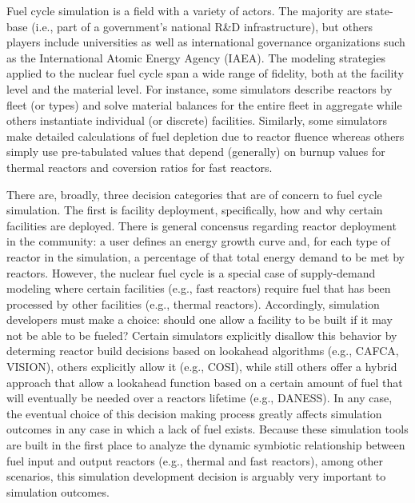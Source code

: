 Fuel cycle simulation is a field with a variety of actors. The majority are
state-base (i.e., part of a government's national R\&D infrastructure), but
others players include universities as well as international governance
organizations such as the International Atomic Energy Agency (IAEA). The
modeling strategies applied to the nuclear fuel cycle span a wide range of
fidelity, both at the facility level and the material level. For instance, some
simulators describe reactors by fleet (or types) and solve material balances for
the entire fleet in aggregate while others instantiate individual (or discrete)
facilities. Similarly, some simulators make detailed calculations of fuel
depletion due to reactor fluence whereas others simply use pre-tabulated values
that depend (generally) on burnup values for thermal reactors and coversion
ratios for fast reactors. 

There are, broadly, three decision categories that are of concern to fuel cycle
simulation. The first is facility deployment, specifically, how and why certain
facilities are deployed. There is general concensus regarding reactor deployment
in the community: a user defines an energy growth curve and, for each type of
reactor in the simulation, a percentage of that total energy demand to be met by
reactors. However, the nuclear fuel cycle is a special case of supply-demand
modeling where certain facilities (e.g., fast reactors) require fuel that has
been processed by other facilities (e.g., thermal reactors). Accordingly,
simulation developers must make a choice: should one allow a facility to be
built if it may not be able to be fueled? Certain simulators explicitly disallow
this behavior by determing reactor build decisions based on lookahead algorithms
(e.g., CAFCA, VISION), others explicitly allow it (e.g., COSI), while still others
offer a hybrid approach that allow a lookahead function based on a certain
amount of fuel that will eventually be needed over a reactors lifetime
(e.g., DANESS). In any case, the eventual choice of this decision making process
greatly affects simulation outcomes in any case in which a lack of fuel
exists. Because these simulation tools are built in the first place to analyze
the dynamic symbiotic relationship between fuel input and output reactors
(e.g., thermal and fast reactors), among other scenarios, this simulation
development decision is arguably very important to simulation outcomes.

